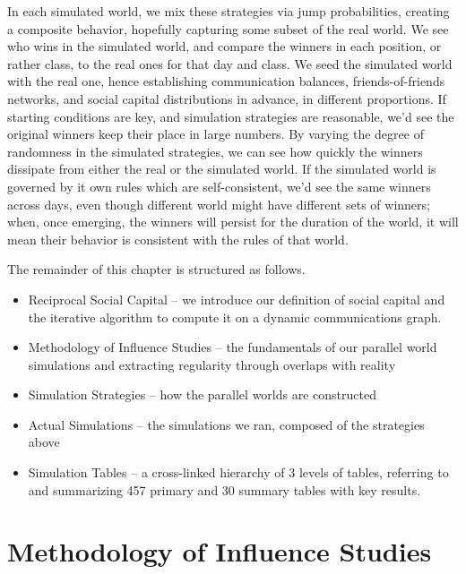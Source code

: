 \documentclass[10pt,oneside]{memoir}
\begin{document}
In each simulated world, we mix these strategies via jump probabilities, creating a composite behavior, hopefully capturing some subset of the real world.  We see who wins in the simulated world, and compare the winners in each position, or rather class, to the real ones for that day and class.  We seed the simulated world with the real one, hence establishing communication balances, friends-of-friends networks, and social capital distributions in advance, in different proportions.  If starting conditions are key, and simulation strategies are reasonable, we'd see the original winners keep their place in large numbers.  By varying the degree of randomness in the simulated strategies, we can see how quickly the winners dissipate from either the real or the simulated world.  If the simulated world is governed by it own rules which are self-consistent, we'd see the same winners across days, even though different world might have different sets of winners; when, once emerging, the winners will persist for the duration of the world, it will mean their behavior is consistent with the rules of that world.


The remainder of this chapter is structured as follows.


\begin{itemize}


\item Reciprocal Social Capital -- we introduce our definition of social capital and the iterative algorithm to compute it on a dynamic communications graph.

\item Methodology of Influence Studies -- the fundamentals of our parallel world simulations and extracting regularity through overlaps with reality

\item Simulation Strategies -- how the parallel worlds are constructed

\item Actual Simulations -- the simulations we ran, composed of the strategies above

\item Simulation Tables -- a cross-linked hierarchy of 3 levels of tables, referring to and summarizing 457 primary and 30 summary tables with key results.
\end{itemize}

\pagebreak \section{Methodology of Influence Studies}
\label{methodologyofinfluencestudies}
\end{document}
